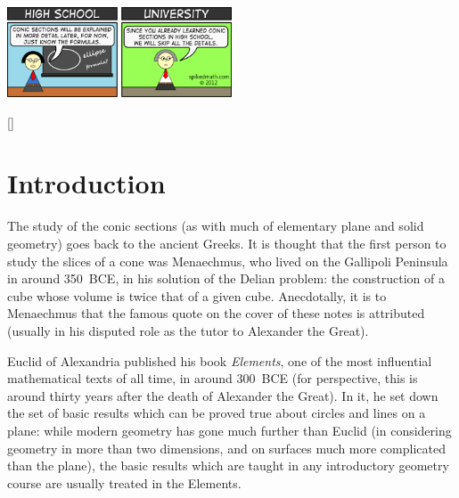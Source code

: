 \documentclass[a4paper,leqno,9pt]{article}
\theoremstyle{exercise}
\theoremstyle{plain}
\theoremstyle{definition}
\theoremstyle{remark}
\begin{document}
\begin{center}
  \includegraphics[width=0.5\textwidth]{conics}
\end{center}

[{\titlerule[0.8pt]}]
\let\oldsection\section
\renewcommand\section{\clearpage\oldsection}
\section{Introduction}
The study of the conic sections (as with much of elementary plane and solid geometry) goes back to the ancient Greeks. It is
thought that the first person to study the slices of a cone was Menaechmus, who lived on the Gallipoli Peninsula in around 350~BCE,
in his solution of the Delian problem: the construction of a cube whose volume is twice that of a given cube. Anecdotally, it is to
Menaechmus that the famous quote on the cover of these notes is attributed (usually in his disputed role as the tutor to Alexander the Great).

Euclid of Alexandria published his book \emph{Elements}, one of the most influential mathematical texts of all time, in around
300~BCE (for perspective, this is around thirty years after the death of Alexander the Great). In it, he set down the set
of basic results which can be proved true about circles and lines on a plane: while modern geometry has gone much further than
Euclid (in considering geometry in more than two dimensions, and on surfaces much more complicated than the plane), the basic
results which are taught in any introductory geometry course are usually treated in the Elements.
\end{document}

